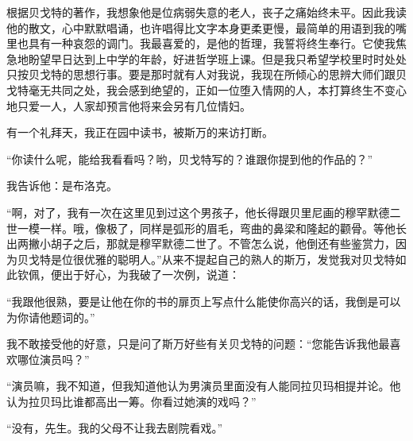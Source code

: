 \par 根据贝戈特的著作，我想象他是位病弱失意的老人，丧子之痛始终未平。因此我读他的散文，心中默默唱诵，也许唱得比文字本身更柔更慢，最简单的用语到我的嘴里也具有一种哀怨的调门。我最喜爱的，是他的哲理，我誓将终生奉行。它使我焦急地盼望早日达到上中学的年龄，好进哲学班上课。但是我只希望学校里时时处处只按贝戈特的思想行事。要是那时就有人对我说，我现在所倾心的思辨大师们跟贝戈特毫无共同之处，我会感到绝望的，正如一位堕入情网的人，本打算终生不变心地只爱一人，人家却预言他将来会另有几位情妇。
\par 有一个礼拜天，我正在园中读书，被斯万的来访打断。
\par “你读什么呢，能给我看看吗？哟，贝戈特写的？谁跟你提到他的作品的？”
\par 我告诉他：是布洛克。
\par “啊，对了，我有一次在这里见到过这个男孩子，他长得跟贝里尼画的穆罕默德二世一模一样。哦，像极了，同样是弧形的眉毛，弯曲的鼻梁和隆起的颧骨。等他长出两撇小胡子之后，那就是穆罕默德二世了。不管怎么说，他倒还有些鉴赏力，因为贝戈特是位很优雅的聪明人。”从来不提起自己的熟人的斯万，发觉我对贝戈特如此钦佩，便出于好心，为我破了一次例，说道：
\par “我跟他很熟，要是让他在你的书的扉页上写点什么能使你高兴的话，我倒是可以为你请他题词的。”
\par 我不敢接受他的好意，只是问了斯万好些有关贝戈特的问题：“您能告诉我他最喜欢哪位演员吗？”
\par “演员嘛，我不知道，但我知道他认为男演员里面没有人能同拉贝玛相提并论。他认为拉贝玛比谁都高出一筹。你看过她演的戏吗？”
\par “没有，先生。我的父母不让我去剧院看戏。”
